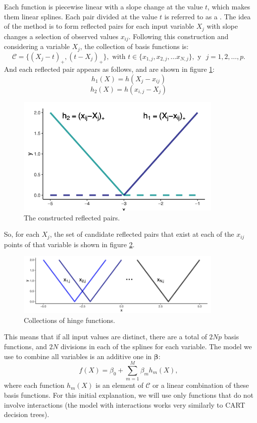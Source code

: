 Each function is piecewise linear with a slope change at the value $t$, which makes them linear splines. Each pair divided at the value $t$ is referred to as a . The idea of the method is to form reflected pairs for each input variable $X_j$ with slope changes a selection of observed values $x_{ij}$. Following this construction and considering a variable $X_j$, the collection of basis functions is:
$$
\mathcal{C} = \{ (X_j - t)_+, (t - X_j)_+ \}, \text{ with } t \in \{ x_{1,j}, x_{2,j}, \ldots x_{N,j} \}, \text{ y } \,\, j = 1,2, \ldots , p.
$$
And each reflected pair appears as follows, and are shown in figure \ref{reflected_pairs}: 
$$
h_1(X) = h(X_j - x_{ij}) 
$$
$$
h_2(X) = h(x_{i,j} - X_j)
$$
\begin{figure}[h]
	\includegraphics[width=10cm]{Figures/3ref_pair.png}
	\centering
	\caption{The constructed reflected pairs.}
	\label{reflected_pairs}
\end{figure}
So, for each $X_j$, the set of candidate reflected pairs that exist at each of the $x_{ij}$ points of that variable is shown in figure \ref{hinges}. 
\begin{figure}[h]
	\includegraphics[width=10cm]{Figures/3hinge.png}
	\centering
	\caption{Collections of hinge functions.}
	\label{hinges}
\end{figure}

This means that if all input values are distinct, there are a total of $2Np$ basis functions, and $2N$ divisions in each of the splines for each variable. The model we use to combine all variables is an additive one in $\boldsymbol\beta$:
$$
f(X) = \beta_0 + \sum_{m=1}^M \beta_m h_m(X),
$$
where each function $h_m(X)$ is an element of $\mathcal{C}$ or a linear combination of these basis functions. For this initial explanation, we will use only functions that do not involve interactions (the model with interactions works very similarly to CART decision trees).

